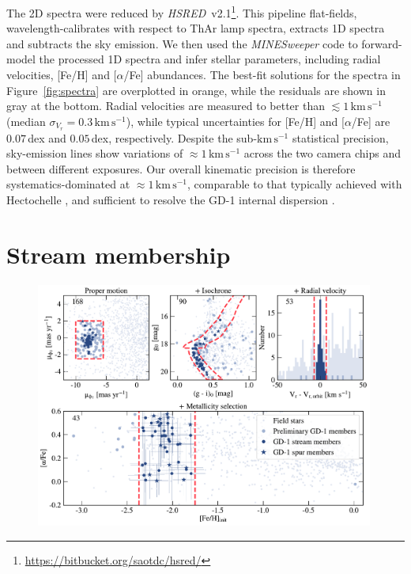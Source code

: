 \documentclass[twocolumn]{aastex63}
\newcommand{\package}[1]{\textsl{#1}}
\newcommand{\kms}{\ensuremath{\textrm{km}\,\textrm{s}^{-1}}}
\begin{document}
The 2D spectra were reduced by \package{HSRED}~v2.1\footnote{\url{https://bitbucket.org/saotdc/hsred/}}.
This pipeline flat-fields, wavelength-calibrates with respect to ThAr lamp spectra, extracts 1D spectra and subtracts the sky emission.
We then used the \package{MINESweeper} code \citep{cargile2019} to forward-model the processed 1D spectra and infer stellar parameters, including radial velocities, [Fe/H] and [$\alpha$/Fe] abundances.
The best-fit solutions for the spectra in Figure~\ref{fig:spectra} are overplotted in orange, while the residuals are shown in gray at the bottom.
Radial velocities are measured to better than $\lesssim1\,\kms$ (median $\sigma_{V_r}=0.3\,\kms$), while typical uncertainties for [Fe/H] and [$\alpha$/Fe] are $0.07$\,dex and $0.05$\,dex, respectively.
Despite the sub-$\kms$ statistical precision, sky-emission lines show variations of $\approx1\,\kms$ across the two camera chips and between different exposures.
Our overall kinematic precision is therefore systematics-dominated at $\approx1\,\kms$, comparable to that typically achieved with Hectochelle \citep[e.g.,][]{caldwell2017}, and sufficient to resolve the GD-1 internal dispersion \citep{malhan2019}.

\section{Stream membership}
\label{sec:membership}

\begin{figure}
\begin{center}
\includegraphics[width=0.99\textwidth]{members.pdf}
\end{center}
\caption{
}
\label{fig:members}
\end{figure}
\end{document}
